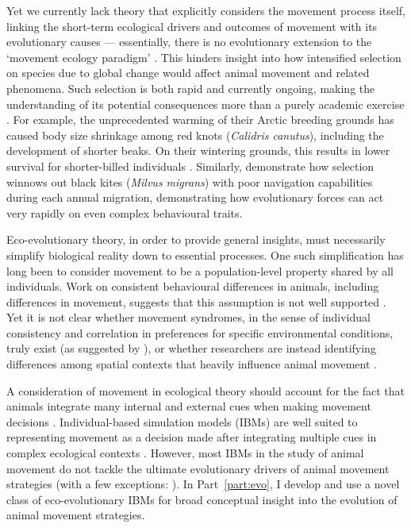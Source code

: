 Yet we currently lack theory that explicitly considers the movement process itself, linking the short-term ecological drivers and outcomes of movement with its evolutionary causes --- essentially, there is no evolutionary extension to the `movement ecology paradigm' \citep{holyoak2008,nathan2008a}.
This hinders insight into how intensified selection on species due to global change would affect animal movement and related phenomena.
Such selection is both rapid and currently ongoing, making the understanding of its potential consequences more than a purely academic exercise \parencite{bonnet2022}.
For example, the unprecedented warming of their Arctic breeding grounds has caused body size shrinkage among red knots (\emph{Calidris canutus}), including the development of shorter beaks.
On their wintering grounds, this results in lower survival for shorter-billed individuals \citep[e.g.][]{vangils2016}.
Similarly, \textcite{sergio2022} demonstrate how selection winnows out black kites (\emph{Milvus migrans}) with poor navigation capabilities during each annual migration, demonstrating how evolutionary forces can act very rapidly on even complex behavioural traits.

Eco-evolutionary theory, in order to provide general insights, must necessarily simplify biological reality down to essential processes.
One such simplification has long been to consider movement to be a population-level property shared by all individuals.
Work on consistent behavioural differences in animals, including differences in movement, suggests that this assumption is not well supported \citep{spiegel2017,shaw2020,stuber2022,webber2018,webber2020,abrahms2017}.
Yet it is not clear whether movement syndromes, in the sense of individual consistency and correlation in preferences for specific environmental conditions, truly exist (as suggested by \cite{stuber2022}), or whether researchers are instead identifying differences among spatial contexts that heavily influence animal movement \parencite[][]{spiegel2022}.

A consideration of movement in ecological theory should account for the fact that animals integrate many internal and external cues when making movement decisions \citep{nathan2008a}.
Individual-based simulation models (IBMs) are well suited to representing movement as a decision made after integrating multiple cues in complex ecological contexts \citep{huston1988,deangelis2019}.
However, most IBMs in the study of animal movement do not tackle the ultimate evolutionary drivers of animal movement strategies (with a few exceptions: \cite{getz2015,getz2016,netz2021}).
In Part~\ref{part:evo}, I develop and use a novel class of eco-evolutionary IBMs for broad conceptual insight into the evolution of animal movement strategies.

